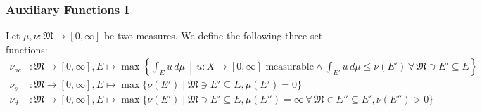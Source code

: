 \documentclass[10pt, hyperref={hidelinks}]{beamer}
\begin{document}
    \begin{frame}
        \frametitle{Auxiliary Functions I}

        \begin{definition} \label{def:basics_on_measure_relations}
            Let \(\mu, \nu\colon \mathfrak{M} \to [0, \infty]\) be two measures. We define the following three set functions:
            \scriptsize\begin{align}
                \nu_{ac}&\colon \mathfrak{M} \to [0, \infty], E \mapsto \max\left\{\int_E u \, d\mu \, \middle\vert \, u\colon X \to [0, \infty] \text{ measurable} \land \int_{E'} u \, d\mu \leq \nu(E') \, \forall \, \mathfrak{M} \ni E' \subseteq E\right\}\\
                \nu_s&\colon \mathfrak{M} \to [0, \infty], E \mapsto \max\{\nu(E') \mid \mathfrak{M} \ni E' \subseteq E, \mu(E') = 0\} \\
                \nu_d&\colon \mathfrak{M} \to [0, \infty], E \mapsto \max\{\nu(E') \mid \mathfrak{M} \ni E' \subseteq E, \mu(E'') = \infty \, \forall \, \mathfrak{M} \in E'' \subseteq E', \nu(E'') > 0\}
            \end{align}
        \end{definition}
    \end{frame}
\end{document}
